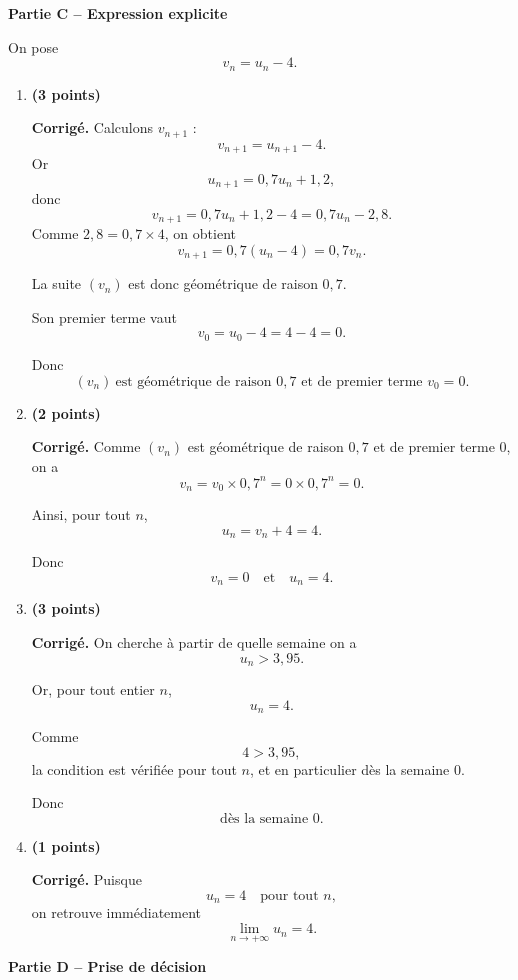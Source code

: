 \documentclass[11pt,a4paper]{article}
\newcommand{\bareme}[1]{\hfill{\color{blue!70!black}\textbf{(#1 points)}}}
\newcommand{\corr}{\noindent\textcolor{blue!70!black}{\textbf{Corrigé. }}}
\begin{document}
\medskip

\textbf{Partie C -- Expression explicite}

On pose
\[
v_n=u_n-4.
\]

\begin{enumerate}[label=\textbf{C.\arabic*.}, leftmargin=0.9cm]

\item \bareme{3}

\corr Calculons $v_{n+1}$ :
\[
v_{n+1}=u_{n+1}-4.
\]
Or
\[
u_{n+1}=0{,}7u_n+1{,}2,
\]
donc
\[
v_{n+1}=0{,}7u_n+1{,}2-4=0{,}7u_n-2{,}8.
\]
Comme $2{,}8=0{,}7\times 4$, on obtient
\[
v_{n+1}=0{,}7(u_n-4)=0{,}7v_n.
\]

La suite $(v_n)$ est donc géométrique de raison $0{,}7$.

Son premier terme vaut
\[
v_0=u_0-4=4-4=0.
\]

Donc
\[
\boxed{(v_n)\ \text{est géométrique de raison }0{,}7\text{ et de premier terme }v_0=0.}
\]

\item \bareme{2}

\corr Comme $(v_n)$ est géométrique de raison $0{,}7$ et de premier terme $0$, on a
\[
v_n=v_0\times 0{,}7^n=0\times 0{,}7^n=0.
\]

Ainsi, pour tout $n$,
\[
u_n=v_n+4=4.
\]

Donc
\[
\boxed{v_n=0 \quad \text{et} \quad u_n=4.}
\]

\item \bareme{3}

\corr On cherche à partir de quelle semaine on a
\[
u_n>3{,}95.
\]

Or, pour tout entier $n$,
\[
u_n=4.
\]

Comme
\[
4>3{,}95,
\]
la condition est vérifiée pour tout $n$, et en particulier dès la semaine $0$.

Donc
\[
\boxed{\text{dès la semaine }0.}
\]

\item \bareme{1}

\corr Puisque
\[
u_n=4
\quad \text{pour tout }n,
\]
on retrouve immédiatement
\[
\boxed{\lim_{n\to+\infty}u_n=4.}
\]

\end{enumerate}

\medskip

\textbf{Partie D -- Prise de décision}
\end{document}
